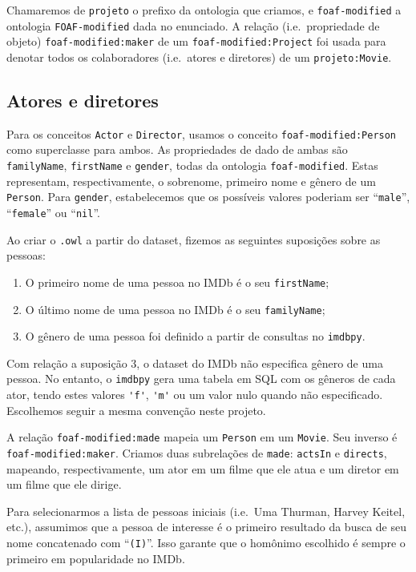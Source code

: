 \documentclass{article}
\newcommand{\code}[1]{\lstinline[mathescape=true]{#1}}
\begin{document}
Chamaremos de \code{projeto} o prefixo da ontologia que criamos, e \code{foaf-modified} a ontologia
\code{FOAF-modified} dada no enunciado. A relação (i.e.\ propriedade de objeto)
\code{foaf-modified:maker} de um \code{foaf-modified:Project} foi usada para denotar todos os
colaboradores (i.e.\ atores e diretores) de um \code{projeto:Movie}.

\subsection{Atores e diretores}

Para os conceitos \code{Actor} e \code{Director}, usamos o conceito \code{foaf-modified:Person}
como superclasse para ambos. As propriedades de dado de ambas são \code{familyName},
\code{firstName} e \code{gender}, todas da ontologia \code{foaf-modified}. Estas representam,
respectivamente, o sobrenome, primeiro nome e gênero de um \code{Person}. Para \code{gender},
estabelecemos que os possíveis valores poderiam ser ``\code{male}'', ``\code{female}'' ou
``\code{nil}''.

Ao criar o \code{.owl} a partir do dataset, fizemos as seguintes suposições sobre as pessoas:

\begin{enumerate}
  \item O primeiro nome de uma pessoa no IMDb é o seu \code{firstName};
  \item O último nome de uma pessoa no IMDb é o seu \code{familyName};
  \item O gênero de uma pessoa foi definido a partir de consultas no \code{imdbpy}.
\end{enumerate}

Com relação a suposição 3, o dataset do IMDb não especifica gênero de uma pessoa. No entanto, o
\code{imdbpy} gera uma tabela em SQL com os gêneros de cada ator, tendo estes valores \code{'f'},
\code{'m'} ou um valor nulo quando não especificado. Escolhemos seguir a mesma convenção neste
projeto.

A relação \code{foaf-modified:made} mapeia um \code{Person} em um \code{Movie}. Seu inverso é
\code{foaf-modified:maker}. Criamos duas subrelações de \code{made}: \code{actsIn} e
\code{directs}, mapeando, respectivamente, um ator em um filme que ele atua e um diretor em um
filme que ele dirige.

Para selecionarmos a lista de pessoas iniciais (i.e.\ Uma Thurman, Harvey Keitel, etc.), assumimos
que a pessoa de interesse é o primeiro resultado da busca de seu nome concatenado com
``\code{(I)}''. Isso garante que o homônimo escolhido é sempre o primeiro em popularidade no IMDb.
\end{document}
